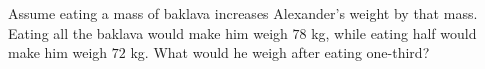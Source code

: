 Assume eating a mass of baklava increases Alexander's weight by that mass. Eating all the baklava would make him weigh $78$ kg, while eating half would make him weigh $72$ kg. What would he weigh after eating one-third?
